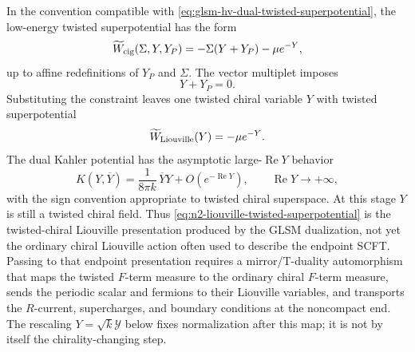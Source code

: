 In the convention compatible with
\eqref{eq:glsm-hv-dual-twisted-superpotential}, the
low-energy twisted superpotential has the form
\begin{equation}
  \widetilde W_{\rm cig}(\Sigma,Y,Y_P)
  =
  -\Sigma(Y+Y_P)
  -
  \mu e^{-Y},
  \label{eq:cigar-liouville-dual-superpotential-before-constraint}
\end{equation}
up to affine redefinitions of \(Y_P\) and \(\Sigma\).  The vector multiplet
imposes
\begin{equation}
  Y+Y_P=0 .
  \label{eq:cigar-liouville-linear-constraint}
\end{equation}
Substituting the constraint leaves one twisted chiral variable \(Y\) with
twisted superpotential
\begin{equation}
  \widetilde W_{\rm Liouville}(Y)
  =
  -\mu e^{-Y}.
  \label{eq:n2-liouville-twisted-superpotential}
\end{equation}
The dual Kahler potential has the asymptotic large-\(\operatorname{Re}Y\)
behavior
\begin{equation}
  K(Y,\overline Y)
  =
  \frac{1}{8\pi k}\,\overline Y Y
  +
  O(e^{-\operatorname{Re}Y}),
  \qquad
  \operatorname{Re}Y\to+\infty,
  \label{eq:n2-liouville-asymptotic-kahler}
\end{equation}
with the sign convention appropriate to twisted chiral superspace.  At this
stage \(Y\) is still a twisted chiral field.  Thus
\eqref{eq:n2-liouville-twisted-superpotential} is the twisted-chiral
Liouville presentation produced by the GLSM dualization, not yet the ordinary
chiral Liouville action often used to describe the endpoint SCFT.  Passing to
that endpoint presentation requires a mirror/T-duality automorphism that maps
the twisted \(F\)-term measure to the ordinary chiral \(F\)-term measure, sends
the periodic scalar and fermions to their Liouville variables, and transports
the \(R\)-current, supercharges, and boundary conditions at the noncompact end.
The rescaling \(Y=\sqrt{k}\mathcal Y\) below fixes normalization after this map;
it is not by itself the chirality-changing step.

